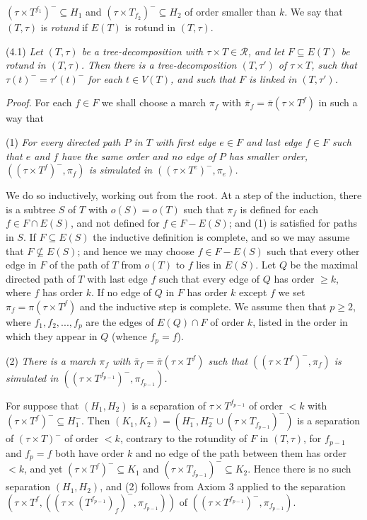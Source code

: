 \noindent $(\tau \times T^{f_1})^- \subseteq H_1$ and $(\tau \times T_{f_2})^- \subseteq H_2$ of order smaller than $k$. We say that $(T, \tau)$ is \textit{rotund} if $E(T)$ is rotund in $(T, \tau)$.

\stmt
(4.1) \textit{Let $(T, \tau)$ be a tree-decomposition with $\tau \times T \in \mathscr{R}$, and let $F \subseteq E(T)$ be rotund in $(T, \tau)$. Then there is a tree-decomposition $(T, \tau')$ of $\tau \times T$, such that $\tau(t)^- = \tau'(t)^-$ for each $t \in V(T)$, and such that $F$ is linked in $(T, \tau')$.}

\textit{Proof.} For each $f \in F$ we shall choose a march $\pi_f$ with $\bar{\pi}_f = \bar{\pi}(\tau \times T^f)$ in such a way that

\hspace*{12pt}(1) \textit{For every directed path $P$ in $T$ with first edge $e \in F$ and last edge $f \in F$ such that $e$ and $f$ have the same order and no edge of $P$ has smaller order, $((\tau \times T^f)^-, \pi_f)$ is simulated in $((\tau \times T^e)^-, \pi_e)$.}

We do so inductively, working out from the root. At a step of the induction, there is a subtree $S$ of $T$ with $o(S) = o(T)$ such that $\pi_f$ is defined for each $f \in F \cap E(S)$, and not defined for $f \in F - E(S)$; and (1) is satisfied for paths in $S$. If $F \subseteq E(S)$ the inductive definition is complete, and so we may assume that $F \nsubseteq E(S)$; and hence we may choose $f \in F - E(S)$ such that every other edge in $F$ of the path of $T$ from $o(T)$ to $f$ lies in $E(S)$. Let $Q$ be the maximal directed path of $T$ with last edge $f$ such that every edge of $Q$ has order $\ge k$, where $f$ has order $k$. If no edge of $Q$ in $F$ has order $k$ except $f$ we set $\pi_f = \pi(\tau \times T^f)$ and the inductive step is complete. We assume then that $p \ge 2$, where $f_1, f_2, ..., f_p$ are the edges of $E(Q) \cap F$ of order $k$, listed in the order in which they appear in $Q$ (whence $f_p = f$).

\hspace*{12pt}(2) \textit{There is a march $\pi_f$ with $\bar{\pi}_f = \bar{\pi}(\tau \times T^f)$ such that $((\tau \times T^f)^-, \pi_f)$ is simulated in $((\tau \times T^{f_{p-1}})^-, \pi_{f_{p-1}})$.}

For suppose that $(H_1, H_2)$ is a separation of $\tau \times T^{f_{p-1}}$ of order $< k$ with $(\tau \times T^f)^- \subseteq H_1^-$. Then $(K_1, K_2) = (H_1^-, H_2^- \cup (\tau \times T_{f_{p-1}})^-)$ is a separation of $(\tau \times T)^-$ of order $< k$, contrary to the rotundity of $F$ in $(T, \tau)$, for $f_{p-1}$ and $f_p = f$ both have order $k$ and no edge of the path between them has order $< k$, and yet $(\tau \times T^f)^- \subseteq K_1$ and $(\tau \times T_{f_{p-1}})^- \subseteq K_2$. Hence there is no such separation $(H_1, H_2)$, and (2) follows from Axiom 3 applied to the separation $(\tau \times T^f, ((\tau \times (T^{f_{p-1}})_f)^-, \pi_{f_{p-1}}))$ of $((\tau \times T^{f_{p-1}})^-, \pi_{f_{p-1}})$.

